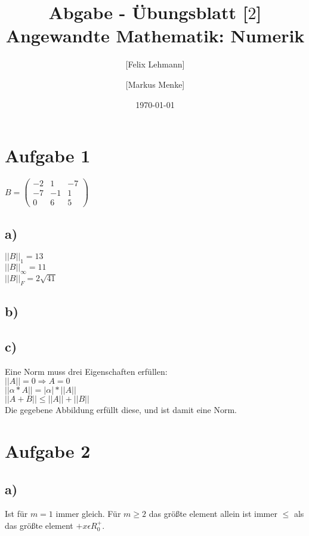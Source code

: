 \documentclass[10pt,a4paper]{article}
\begin{document}
\title{Abgabe - Übungsblatt [$2$]\\
\small{Angewandte Mathematik: Numerik}}
\author{ [Felix Lehmann] \and [Markus Menke]}
\date{\today}
\maketitle

\section*{Aufgabe 1}
$B = \begin{pmatrix}
    -2 &  1 & -7\\
    -7 & -1 &  1\\
     0 &  6 &  5
    \end{pmatrix}$

\subsection*{a)}
$||B||_1 = 13$\\
$||B||_\infty = 11$\\
$||B||_F = 2\sqrt{41}$

\subsection*{b)}


\subsection*{c)}
Eine Norm muss drei Eigenschaften erfüllen:\\
$||A|| = 0 \Rightarrow A = 0$\\
$||\alpha*A|| = |\alpha|*||A||$\\
$||A+B|| \leq ||A|| + ||B||$\\
Die gegebene Abbildung erfüllt diese, und ist damit eine Norm.

\section*{Aufgabe 2}
\subsection*{a)}
Ist für $m=1$ immer gleich.
Für $m \geq 2$ das größte element allein ist immer $\leq$ als das größte element $+ x\epsilon R_0^+$.
\end{document}
